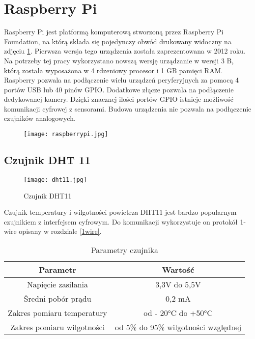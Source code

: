 \section{Raspberry Pi} \label{raspi}
Raspberry Pi jest platformą komputerową stworzoną przez Raspberry Pi Foundation, na którą składa się pojedynczy obwód drukowany widoczny na zdjęciu \ref{fig:raspberrypi}. Pierwsza wersja tego urządzenia została zaprezentowana w 2012 roku. Na potrzeby tej pracy wykorzystano nowszą wersję urządzanie w wersji 3 B, którą została wyposażona w 4 rdzeniowy procesor i 1 GB pamięci RAM. Raspberry pozwala na podłączenie wielu urządzeń peryferyjnych za pomocą 4 portów USB lub 40 pinów GPIO. Dodatkowe złącze pozwala na podłączenie dedykowanej kamery. Dzięki znacznej ilości portów GPIO istnieje możliwość komunikacji cyfrowej z sensorami. Budowa urządzenia nie pozwala na podłączenie czujników analogowych.
\begin{figure}[H]
	\centering
	\texttt{[image: raspberrypi.jpg]}
	\label{fig:raspberrypi}
\end{figure}

\subsection{Czujnik DHT 11}
\begin{figure}[H]
	\centering
	\texttt{[image: dht11.jpg]}
	\caption{Czujnik DHT11}
	\label{fig:dht11}
\end{figure}
Czujnik temperatury i wilgotności powietrza DHT11 jest bardzo popularnym czujnikiem z interfejsem cyfrowym. Do komunikacji wykorzystuje on protokół 1-wire opisany w rozdziale \ref{1wire}.
\begin{table}[H]
	\centering
	\caption{Parametry czujnika}
	\begin{tabular}{|c|c|}
  		\hline 
  		\bfseries Parametr & \bfseries Wartość \\
  		\hline
  		Napięcie zasilania & 3,3V do 5,5V\\
  		\hline
  		Średni pobór prądu & 0,2 mA\\
  		\hline 
  		Zakres pomiaru temperatury & od - 20\si{\degree}C do +50\si{\degree}C\\
  		\hline 
  		Zakres pomiaru wilgotności & od 5\% do 95\% wilgotności względnej\\
  		\hline 
  	\end{tabular}
\end{table}

